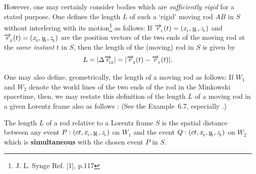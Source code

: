 However, one may certainly consider bodies which are 
\textsl{sufficiently rigid} for a stated purpose. One 
defines the length $L$ of such a `rigid'  moving rod 
$AB$ in 
$S$ without interfering with its motion\footnote{J. L. 
Synge 
Ref. [1], p.117} as follows: If $\overrightarrow{r}_{_{\hspace*{-1.5pt}{1}}}(t) = 
(x_{_{\hspace*{-1.5pt}{1}}},y_{_{\hspace*{-1.5pt}{1}}},z_{_{\hspace*{-1.5pt}{1}}})$ and 
$\overrightarrow{r}_{_{\hspace*{-1.5pt}{2}}}(t)= 
(x_{_{\hspace*{-1.5pt}{2}}},y_{_{\hspace*{-1.5pt}{2}}}, z_{_{\hspace*{-1.5pt}{2}}})$ are the position 
vectors 
of the two ends of the moving rod at the \textsl{same 
instant} $t$ in $S$, then the length of the (moving) 
rod in 
$S$ is given by
\begin{align*}
L =|\Delta\overrightarrow{r}_{_{\hspace*{-1.5pt}{\negthinspace\negthinspace 12}}} | = 
|\overrightarrow{r}_{_{\hspace*{-1.5pt}{2}}}(t) -
\overrightarrow{r}_{_{\hspace*{-1.5pt}{1}}}(t)|.
\end{align*}

One may also define, geometrically, the length of a 
moving 
rod as follows: If $W_1$ and $W_2$ denote the world 
lines 
of the two ends of the rod in the Minkowski spacetime, 
then, 
we may restate this definition of the length $L$ of a 
moving 
rod in a given Lorentz frame also as follows : (See 
the 
Example~6.7, especially .)

\dfn  The length $L$ of a rod relative to a Lorentz 
frame 
$S$ is the spatial distance between any event 
$P:(ct,x_{_{\hspace*{-1.5pt}{1}}},y_{_{\hspace*{-1.5pt}{1}}},z_{_{\hspace*{-1.5pt}{1}}})$ on $W_1$ and 
the 
event $Q:(ct, x_{_{\hspace*{-1.5pt}{2}}},y_{_{\hspace*{-1.5pt}{2}}},z_{_{\hspace*{-1.5pt}{2}}})$ on $W_2$ 
which is \textbf{simultaneous} with the chosen event 
$P$ in 
$S$. 

